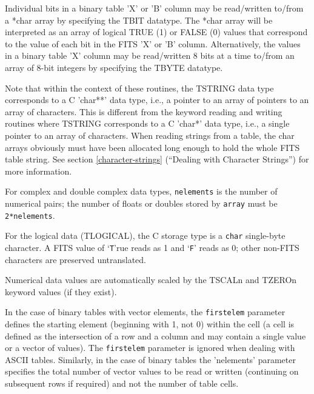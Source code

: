 \documentclass[11pt]{book}
\begin{document}
Individual bits in a binary table 'X' or 'B' column may be read/written
to/from a *char array by specifying the TBIT datatype.  The *char
array will be interpreted as an array of logical TRUE (1) or FALSE (0)
values that correspond to the value of each bit in the FITS 'X' or 'B' column.
Alternatively, the values in a binary table 'X' column may be read/written
8 bits at a time to/from an array of 8-bit integers by specifying the
TBYTE datatype.

Note that within the context of these routines, the TSTRING data type
corresponds to a C 'char**' data type, i.e., a pointer to an array of
pointers to an array of characters.  This is different from the keyword
reading and writing routines where TSTRING corresponds to a C 'char*'
data type, i.e., a single pointer to an array of characters.  When
reading strings from a table, the char arrays obviously must have been
allocated long enough to hold the whole FITS table string.
See section \ref{character-strings}
(``Dealing with Character Strings'') for more information.

For complex and double complex data types, \verb+nelements+ is the number
of numerical pairs; the number of floats or doubles stored by
\verb+array+ must be \verb+2*nelements+.

For the logical data (TLOGICAL), the C storage type is a \verb+char+
single-byte character.  A FITS value of `\verb+T+'rue reads as 1 and
`\verb+F+' reads as 0; other non-FITS characters are preserved untranslated.

Numerical data values are automatically scaled by the TSCALn and TZEROn
keyword values (if they exist).

In the case of binary tables with vector elements, the \verb+firstelem+
parameter defines the starting element (beginning with 1, not 0) within
the cell (a cell is defined as the intersection of a row and a column
and may contain a single value or a vector of values).  The \verb+firstelem+
parameter is ignored when dealing with ASCII tables. Similarly, in the
case of binary tables the 'nelements' parameter specifies the total
number of vector values to be read or written (continuing on subsequent
rows if required) and not the number of table cells.
\end{document}

